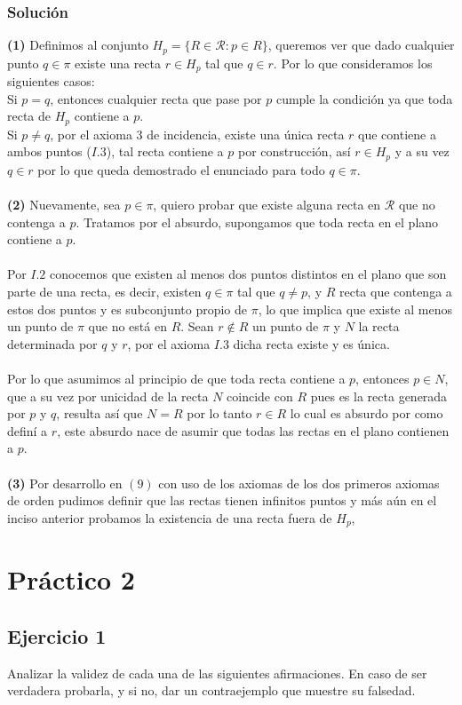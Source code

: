 \documentclass[a4paper]{article}
\begin{document}
\subsubsection{Solución}
\textbf{(1)} Definimos al conjunto $H_p=\{R \in \mathcal{R}: p \in R\}$, queremos ver que dado cualquier punto $q \in \pi$ existe una recta $r \in H_p$ tal que $q \in r$. Por lo que consideramos los siguientes casos:\\
Si $p=q$, entonces cualquier recta que pase por $p$ cumple la condición ya que toda recta de $H_p$ contiene a $p$.\\
Si $p \neq q$, por el axioma 3 de incidencia, existe una única recta $r$ que contiene a ambos puntos ($I.3$), tal recta contiene a $p$ por construcción, así $r \in H_p$ y a su vez $q \in r$ por lo que queda demostrado el enunciado para todo $q \in \pi$.\\\\
\textbf{(2)} Nuevamente, sea $p \in \pi$, quiero probar que existe alguna recta en $\mathcal{R}$ que no contenga a $p$. Tratamos por el absurdo, supongamos que toda recta en el plano contiene a $p$.\\\\
Por $I.2$ conocemos que existen al menos dos puntos distintos en el plano que son parte de una recta, es decir, existen $q \in \pi$ tal que $q \neq p$, y $R$ recta que contenga a estos dos puntos y es subconjunto propio de $\pi$, lo que implica que existe al menos un punto de $\pi$ que no está en $R$. Sean $r \notin R$ un punto de $\pi$ y $N$ la recta determinada por $q$ y $r$, por el axioma $I.3$ dicha recta existe y es única.\\\\
Por lo que asumimos al principio de que toda recta contiene a $p$, entonces $p \in N$, que a su vez por unicidad de la recta $N$ coincide con $R$ pues es la recta generada por $p$ y $q$, resulta así que $N = R$ por lo tanto $r \in R$ lo cual es absurdo por como definí a $r$, este absurdo nace de asumir que todas las rectas en el plano contienen a $p$.\\\\
\textbf{(3)} Por desarrollo en $(9)$ con uso de los axiomas de los dos primeros axiomas de orden pudimos definir que las rectas tienen infinitos puntos y más aún en el inciso anterior probamos la existencia de una recta fuera de $H_p$, 
\section{Práctico 2}
\subsection{Ejercicio 1} Analizar la validez de cada una de las siguientes afirmaciones. En caso de ser verdadera probarla, y si no, dar un contraejemplo que muestre su falsedad.
\end{document}
